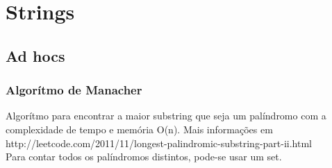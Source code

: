 \section{Strings}

\subsection{Ad hocs}
\subsubsection{Algorítmo de Manacher}
Algor\'{i}tmo para encontrar a maior substring que seja um pal\'{i}ndromo com a complexidade de tempo e mem\'{o}ria O(n).
Mais informa\c{c}\~{o}es em http://leetcode.com/2011/11/longest-palindromic-substring-part-ii.html
\\ Para contar todos os palíndromos distintos, pode-se usar um set.

